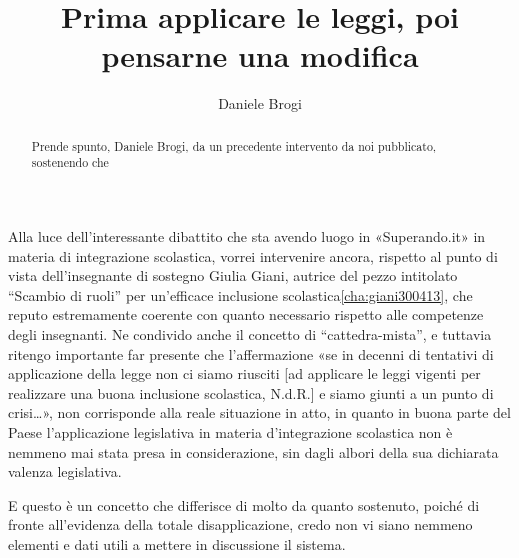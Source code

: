 \author{Daniele Brogi}
\title{Prima applicare le leggi, poi pensarne una modifica}
\label{brogi030513}
\begin{abstract}
Prende spunto, Daniele Brogi, da un precedente intervento da noi pubblicato, sostenendo che 
\end{abstract}
\maketitle
Alla luce dell'interessante dibattito che sta avendo luogo in «Superando.it» in materia di integrazione scolastica, vorrei intervenire ancora, rispetto al punto di vista dell'insegnante di sostegno Giulia Giani, autrice del pezzo intitolato “Scambio di ruoli” per un'efficace inclusione scolastica\ref{cha:giani300413}, che reputo estremamente coerente con quanto necessario rispetto alle competenze degli insegnanti. Ne condivido anche il concetto di “cattedra-mista”, e tuttavia ritengo importante far presente che l'affermazione «se in decenni di tentativi di applicazione della legge non ci siamo riusciti [ad applicare le leggi vigenti per realizzare una buona inclusione scolastica, N.d.R.] e siamo giunti a un punto di crisi…», non corrisponde alla reale situazione in atto, in quanto in buona parte del Paese l'applicazione legislativa in materia d'integrazione scolastica non è nemmeno mai stata presa in considerazione, sin dagli albori della sua dichiarata valenza legislativa.

E questo è un concetto che differisce di molto da quanto sostenuto, poiché di fronte all'evidenza della totale disapplicazione, credo non vi siano nemmeno elementi e dati utili a mettere in discussione il sistema.

